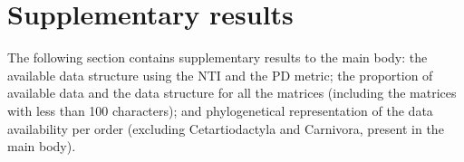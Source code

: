 %
%

\section{Supplementary results}
The following section contains supplementary results to the main body: the available data structure using the NTI and the PD metric; the proportion of available data and the data structure for all the matrices (including the matrices with less than 100 characters); and phylogenetical representation of the data availability per order (excluding Cetartiodactyla and Carnivora, present in the main body).

\renewcommand\baselinestretch{1.2}\selectfont
\begin{center}

\end{center}
\renewcommand\baselinestretch{2}\selectfont

\renewcommand\baselinestretch{1.2}\selectfont
\begin{center}

\end{center}
\renewcommand\baselinestretch{2}\selectfont

\renewcommand\baselinestretch{1.2}\selectfont
\begin{center}

\end{center}
\renewcommand\baselinestretch{2}\selectfont

\renewcommand\baselinestretch{1.2}\selectfont
\begin{center}

\end{center}
\renewcommand\baselinestretch{2}\selectfont

\renewcommand\baselinestretch{1.2}\selectfont
\begin{center}

\end{center}
\renewcommand\baselinestretch{2}\selectfont

\renewcommand\baselinestretch{1.2}\selectfont
\begin{center}

\end{center}
\renewcommand\baselinestretch{2}\selectfont

